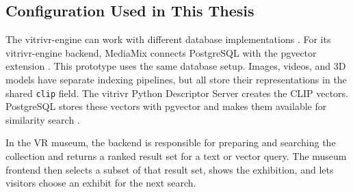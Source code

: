 \subsection{Configuration Used in This Thesis}
\label{subsec:background-vitrivr-configuration}

The vitrivr-engine can work with different database implementations \citep{gasser2024engine}. For its vitrivr-engine backend, MediaMix connects PostgreSQL with the pgvector extension \citep{arnold2026mediamix,pgvector2026}. This prototype uses the same database setup. Images, videos, and 3D models have separate indexing pipelines, but all store their representations in the shared \texttt{clip} field. The vitrivr Python Descriptor Server creates the CLIP vectors. PostgreSQL stores these vectors with pgvector and makes them available for similarity search \citep{vitrivrPythonDescriptorServer2026,pgvector2026}.

In the VR museum, the backend is responsible for preparing and searching the collection and returns a ranked result set for a text or vector query. The museum frontend then selects a subset of that result set, shows the exhibition, and lets visitors choose an exhibit for the next search.

\endgroup
